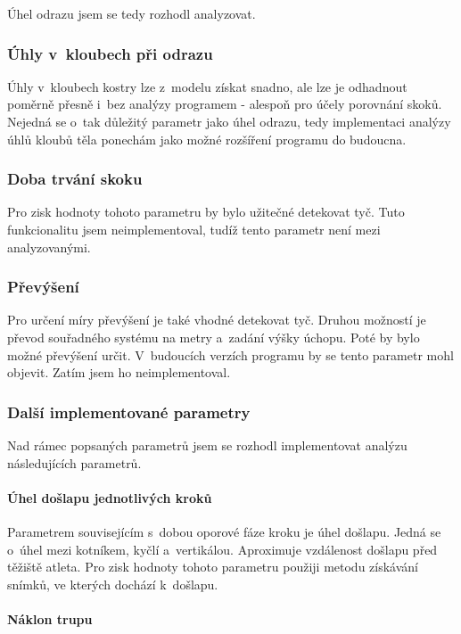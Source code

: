 Úhel odrazu jsem se tedy rozhodl analyzovat.


\subsubsection{Úhly v~kloubech při odrazu}

Úhly v~kloubech kostry lze z~modelu získat snadno, ale lze je odhadnout poměrně přesně i~bez analýzy programem - alespoň pro účely porovnání skoků. Nejedná se o~tak důležitý parametr jako úhel odrazu, tedy implementaci analýzy úhlů kloubů těla ponechám jako možné rozšíření programu do budoucna.


\subsubsection{Doba trvání skoku}

Pro zisk hodnoty tohoto parametru by bylo užitečné detekovat tyč. Tuto funkcionalitu jsem neimplementoval, tudíž tento parametr není mezi analyzovanými.


\subsubsection{Převýšení}

Pro určení míry převýšení je také vhodné detekovat tyč. Druhou možností je převod souřadného systému na metry a~zadání výšky úchopu. Poté by bylo možné převýšení určit. V~budoucích verzích programu by se tento parametr mohl objevit. Zatím jsem ho neimplementoval.


\subsubsection{Další implementované parametry}

Nad rámec popsaných parametrů jsem se rozhodl implementovat analýzu následujících parametrů.

\paragraph{Úhel došlapu jednotlivých kroků}

Parametrem souvisejícím s~dobou oporové fáze kroku je úhel došlapu. Jedná se o~úhel mezi kotníkem, kyčlí a~vertikálou. Aproximuje vzdálenost došlapu před těžiště atleta. Pro zisk hodnoty tohoto parametru použiji metodu získávání snímků, ve kterých dochází k~došlapu.

\paragraph{Náklon trupu}


